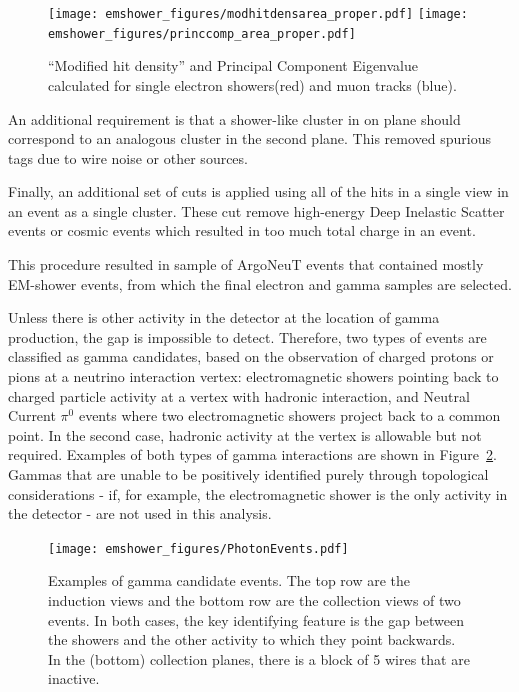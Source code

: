 \begin{figure}[ht]
\centering
\texttt{[image: emshower\_figures/modhitdensarea\_proper.pdf]}
\texttt{[image: emshower\_figures/princcomp\_area\_proper.pdf]}
\caption{\label{fig:separation} ``Modified hit density'' and Principal Component Eigenvalue calculated for single electron showers(red) and muon tracks (blue).}
\end{figure}

An additional requirement is that a shower-like cluster in on plane should correspond to an analogous cluster in the second plane. This removed spurious tags due to wire noise or other sources.




Finally, an additional set of cuts is applied using all of the hits in a single view in an event as a single cluster. These cut remove high-energy Deep Inelastic Scatter events or cosmic events which resulted in too much total charge in an event. 

This procedure resulted in sample of ArgoNeuT events that contained mostly EM-shower events, from which the final electron and gamma samples are selected.

Unless there is other activity in the detector at the location of gamma production, the gap is impossible to detect.  Therefore, two types of events are classified as gamma candidates, based on the observation of charged protons or pions at a neutrino interaction vertex: electromagnetic showers pointing back to charged particle activity at a vertex with hadronic interaction, and Neutral Current $\pi^0$ events where two electromagnetic showers project back to a common point.  In the second case, hadronic activity at the vertex is allowable but not required.  Examples of both types of gamma interactions are shown in Figure~\ref{fig:photons}.  Gammas that are unable to be positively identified purely through topological considerations - if, for example, the electromagnetic shower is the only activity in the detector - are not used in this analysis.



\begin{figure}[ht]
\centering
\texttt{[image: emshower\_figures/PhotonEvents.pdf]}
\caption[Photon Events in \argoneut]{\label{fig:photons} Examples of gamma candidate events.  The top row are the induction views and the bottom row are the collection views of two events. In both cases, the key identifying feature is the gap between the showers and the other activity to which they point backwards.  In the (bottom) collection planes, there is a block of 5 wires that are inactive.}
\end{figure}

